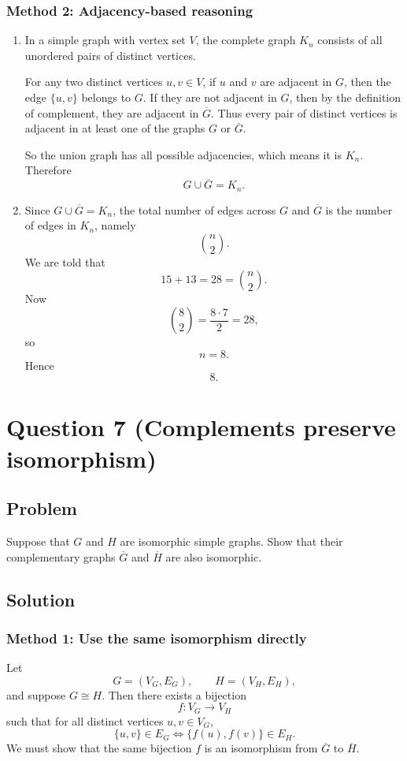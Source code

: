 \documentclass[12pt]{article}
\newcommand{\comp}[1]{\overline{#1}}
\begin{document}
\subsubsection{Method 2: Adjacency-based reasoning}
\begin{enumerate}[label=(\alph*)]
\item In a simple graph with vertex set \(V\), the complete graph \(K_n\) consists of all unordered pairs of distinct vertices.

For any two distinct vertices \(u,v\in V\), if \(u\) and \(v\) are adjacent in \(G\), then the edge \(\{u,v\}\) belongs to \(G\). If they are not adjacent in \(G\), then by the definition of complement, they are adjacent in \(\comp{G}\). Thus every pair of distinct vertices is adjacent in at least one of the graphs \(G\) or \(\comp{G}\).

So the union graph has all possible adjacencies, which means it is \(K_n\). Therefore
\[
\boxed{G\cup \comp{G}=K_n.}
\]

\item Since \(G\cup \comp{G}=K_n\), the total number of edges across \(G\) and \(\comp{G}\) is the number of edges in \(K_n\), namely
\[
\binom{n}{2}.
\]
We are told that
\[
15+13=28=\binom{n}{2}.
\]
Now
\[
\binom{8}{2}=\frac{8\cdot 7}{2}=28,
\]
so
\[
n=8.
\]
Hence
\[
\boxed{8.}
\]
\end{enumerate}

\newpage

\section{Question 7 (Complements preserve isomorphism)}

\subsection{Problem}
Suppose that \(G\) and \(H\) are isomorphic simple graphs. Show that their complementary graphs \(\comp{G}\) and \(\comp{H}\) are also isomorphic.

\subsection{Solution}

\subsubsection{Method 1: Use the same isomorphism directly}
Let
\[
G=(V_G,E_G), \qquad H=(V_H,E_H),
\]
and suppose \(G\cong H\). Then there exists a bijection
\[
f:V_G\to V_H
\]
such that for all distinct vertices \(u,v\in V_G\),
\[
\{u,v\}\in E_G
\iff
\{f(u),f(v)\}\in E_H.
\]
We must show that the same bijection \(f\) is an isomorphism from \(\comp{G}\) to \(\comp{H}\).
\end{document}
